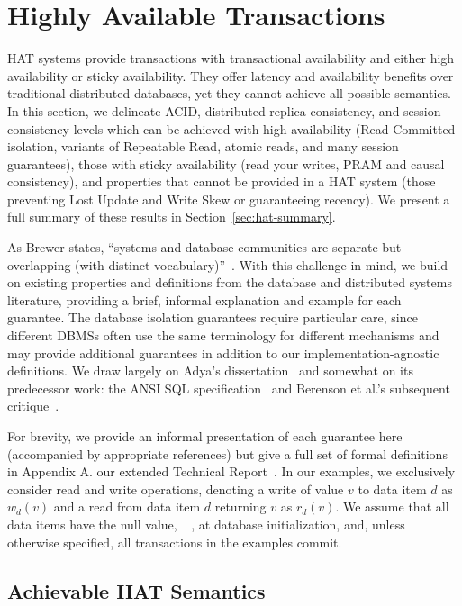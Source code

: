 
\section{Highly Available Transactions}
\label{sec:hats}

HAT systems provide transactions with transactional availability and
either high availability or sticky availability. They offer latency
and availability benefits over traditional distributed databases, yet
they cannot achieve all possible semantics. In this section, we
delineate ACID, distributed replica consistency, and session
consistency levels which can be achieved with high availability (Read
Committed isolation, variants of Repeatable Read, atomic reads, and
many session guarantees), those with sticky availability (read your
writes, PRAM and causal consistency), and properties that cannot be
provided in a HAT system (those preventing Lost Update and Write Skew
or guaranteeing recency).  We present a full summary of these results
in Section~\ref{sec:hat-summary}.

As Brewer states, ``systems and database communities are separate but
overlapping (with distinct vocabulary)''~\cite{brewer-slides}. With
this challenge in mind, we build on existing properties and
definitions from the database and distributed systems literature,
providing a brief, informal explanation and example for each
guarantee. The database isolation guarantees require particular care,
since different DBMSs often use the same terminology for different
mechanisms and may provide additional guarantees in addition to our
implementation-agnostic definitions.  We draw largely on Adya's
dissertation~\cite{adya} and somewhat on its predecessor work: the
ANSI SQL specification~\cite{ansi-sql} and Berenson et al.'s
subsequent critique~\cite{ansicritique}.

For brevity, we provide an informal presentation of each guarantee
here (accompanied by appropriate references) but give a full set of
formal definitions in
\iftechreport
 Appendix A.
\else
 our extended Technical Report~\cite{hat-tr}.
\fi
In our examples, we exclusively consider read and write operations,
denoting a write of value $v$ to data item $d$ as $w_d(v)$ and a read
from data item $d$ returning $v$ as $r_d(v)$. We assume that all data
items have the null value, $\bot$, at database initialization, and,
unless otherwise specified, all transactions in the examples commit.

\subsection{Achievable HAT Semantics}

